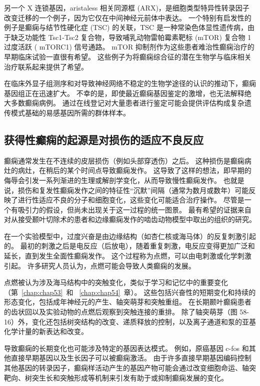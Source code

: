 另一个 X 连锁基因，aristaless 相关同源框 (ARX)，是细胞类型特异性转录因子改变迁移的一个例子，因为它仅在中间神经元前体中表达。
一个特别有启发性的例子是癫痫与结节性硬化症 (TSC) 的关联，TSC 是一种常染色体显性遗传病，由于缺乏功能性 Tsc1-Tsc2 复合物，导致哺乳动物雷帕霉素靶标 (mTOR) 复合物 1 过度活跃 ( mTORC1) 信号通路。
mTOR 抑制剂作为这些患者难治性癫痫治疗的早期临床试验一直很有希望。
这些例子为将癫痫综合征的潜在生物学与临床相关治疗联系起来提供了希望。


在临床外显子组测序和对导致神经网络不稳定的生物学途径的认识的推动下，癫痫基因组正在迅速扩大。
不幸的是，即使最近癫痫基因鉴定的激增，也无法解释绝大多数癫痫病例。
通过在线登记对大量患者进行鉴定可能会提供评估构成复杂遗传模式基础的易感基因所需的群体样本。



\subsection{获得性癫痫的起源是对损伤的适应不良反应}

癫痫通常发生在不连续的皮层损伤（例如头部穿透伤）之后。
这种损伤是癫痫病灶的病灶，在稍后的某个时间点导致癫痫发作。
这导致了这样的想法，即早期的侮辱会引发一系列渐进的生理或解剖学变化，从而导致慢性癫痫发作。
也就是说，损伤和复发性癫痫发作之间的特征性“沉默”间隔（通常为数月或数年）可能反映了进行性适应不良的分子和细胞变化，这些变化可能适合治疗操作。
尽管是一个有吸引力的假设，但尚未出现关于这一过程的统一图景。
最有希望的证据来自对从接受颞叶切除术的患者和边缘癫痫发作的啮齿动物模型中取出的组织的研究。


在一个实验模型中，过度兴奋是由边缘结构（如杏仁核或海马体）的反复刺激引起的。
最初的刺激之后是电反应（后放电），随着重复刺激，电反应变得更加广泛和延长，直到发生全面性癫痫发作。
这个过程称为点燃，可以由电刺激或化学刺激引起。
许多研究人员认为，点燃可能会导致人类癫痫的发展。


点燃被认为涉及海马结构中的突触变化，类似于学习和记忆中的重要变化（第~\ref{chap:chap53}~和 ~\ref{chap:chap54}~章）。
这些包括兴奋性的短期变化和持续的形态变化，包括成年神经元的产生、轴突萌芽和突触重组。
在长期颞叶癫痫患者的齿状回以及实验动物的点燃后观察到突触连接的重排。
除了轴突萌芽（图 58-16）外，变化还包括树突结构的改变、递质释放的控制，以及离子通道和泵的亚基化学计量的新表达和改变。


导致癫痫的长期变化也可能涉及特定的基因表达模式。
例如，原癌基因 c-fos 和其他直接早期基因以及生长因子可以被癫痫激活。
由于许多直接早期基因编码控制其他基因的转录因子，癫痫样活动产生的基因产物可能会通过改变细胞命运、轴突靶向、树突生长和突触形成等机制来引发有助于或抑制癫痫发展的变化。




